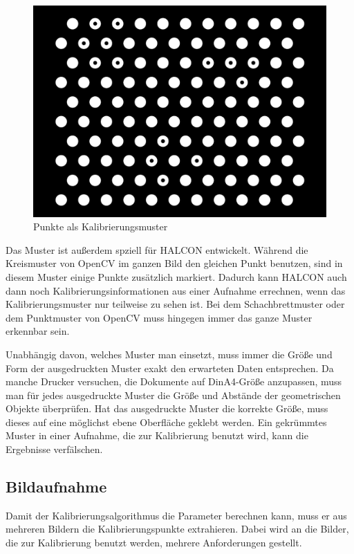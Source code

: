 \begin{figure}[!hbt]
\centering
	\vspace{1ex}
	\includegraphics[scale=0.2]{../images/caltab_hex_10x11}
	\caption[Punkte als Kalibrierungsmuster]{\label{img:caltab_hex_10x11} Punkte als Kalibrierungsmuster}
	\vspace{1ex}
\end{figure}

Das Muster ist außerdem spziell für HALCON entwickelt. Während die Kreismuster von OpenCV im ganzen Bild den gleichen Punkt benutzen, sind in diesem Muster einige Punkte zusätzlich markiert. Dadurch kann HALCON auch dann noch Kalibrierungsinformationen aus einer Aufnahme errechnen, wenn das Kalibrierungsmuster nur teilweise zu sehen ist. Bei dem Schachbrettmuster oder dem Punktmuster von OpenCV muss hingegen immer das ganze Muster erkennbar sein.

Unabhängig davon, welches Muster man einsetzt, muss immer die Größe und Form der ausgedruckten Muster exakt den erwarteten Daten entsprechen. Da manche Drucker versuchen, die Dokumente auf DinA4-Größe anzupassen, muss man für jedes ausgedruckte Muster die Größe und Abstände der geometrischen Objekte überprüfen. Hat das ausgedruckte Muster die korrekte Größe, muss dieses auf eine möglichst ebene Oberfläche geklebt werden. Ein gekrümmtes Muster in einer Aufnahme, die zur Kalibrierung benutzt wird, kann die Ergebnisse verfälschen. 

\subsection{Bildaufnahme} %
\label{sub:bildaufnahme}
Damit der Kalibrierungsalgorithmus die Parameter berechnen kann, muss er aus mehreren Bildern die Kalibrierungspunkte extrahieren. Dabei wird an die Bilder, die zur Kalibrierung benutzt werden, mehrere Anforderungen gestellt. 

